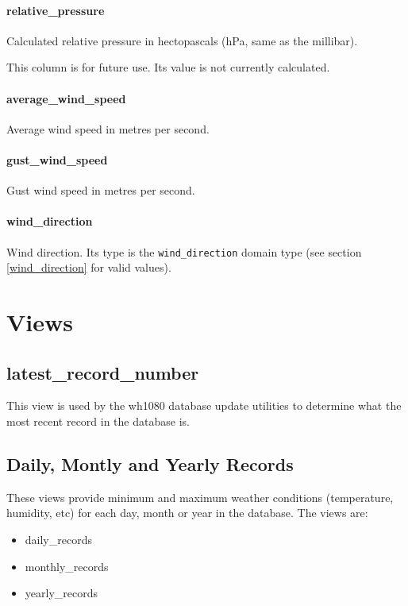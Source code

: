 \documentclass[a4paper,10pt]{book}
\begin{document}
\subsubsection{relative\_pressure}
Calculated relative pressure in hectopascals (hPa, same as the millibar).

This column is for future use. Its value is not currently calculated.

\subsubsection{average\_wind\_speed}
Average wind speed in metres per second.

\subsubsection{gust\_wind\_speed}
Gust wind speed in metres per second.

\subsubsection{wind\_direction}
Wind direction. Its type is the \verb|wind_direction| domain type (see section \ref{wind_direction} for valid values).

\chapter{Views}
\label{cha_views}

\section{latest\_record\_number}
This view is used by the wh1080 database update utilities to determine what the most recent record in the database is.

\section{Daily, Montly and Yearly Records}
These views provide minimum and maximum weather conditions (temperature, humidity, etc) for each day, month or year in the database. The views are:
\begin{itemize}
\item daily\_records
\item monthly\_records
\item yearly\_records
\end{itemize}
\end{document}
